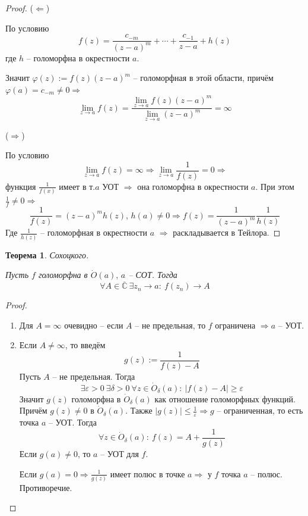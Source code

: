 \documentclass[a4paper,12pt]{article}
\renewcommand{\phi}{\ensuremath{\varphi}}
\renewcommand{\leq}{\ensuremath{\leqslant}}
\renewcommand{\geq}{\ensuremath{\geqslant}}
\theoremstyle{plain}
\newtheorem{theorem}{Теорема}[section]
\theoremstyle{definition}
\theoremstyle{remark}
\begin{document}
\begin{proof}
	($\Leftarrow$)

	По условию
	\[
		f(z) = \frac{c_{-m}}{(z - a)^m} + \cdots + \frac{c_{-1}}{z -a} + h(z)
	\]
	где $h$ -- голоморфна в окрестности $a$.

	Значит $\phi(z) := f(z)(z - a)^m$ -- голоморфная в этой области, причём $\phi(a) = c_{-m} \neq 0 \Rightarrow$
	\[
		\lim_{z \to a}f(z) = \frac{\lim_{z \to a} f(z)(z - a)^m}{\lim_{z \to a} (z - a)^m} = \infty
	\]

	($\Rightarrow$)

	По условию
	\[
		\lim_{z \to a} f(z) = \infty \Rightarrow \lim_{z \to a}\frac{1}{f(z)} = 0 \Rightarrow
	\]
	функция $\frac{1}{f(x)}$ имеет в т.$a$ УОТ $\Rightarrow$ она голоморфна в окрестности $a$. При этом $\frac{1}{f} \neq 0 \Rightarrow$
	\[
		\frac{1}{f(z)} = (z - a)^mh(z),\, h(a) \neq 0 \Rightarrow f(z) = \frac{1}{(z - a)^m}\frac{1}{h(z)}
	\]
	Где $\frac{1}{h(z)}$ -- голоморфная в окрестности $a$ $\Rightarrow$ раскладывается в Тейлора.
\end{proof}

\begin{theorem}
	Сохоцкого.

	Пусть $f$ голоморфна в $\dot{O}(a),\, a$ -- СОТ. Тогда
	\[
		\forall A \in \overline{\mathbb{C}} \: \exists z_n \to a :\: f(z_n) \to A
	\]
\end{theorem}

\begin{proof}
	\begin{enumerate}
		\item Для $A = \infty$ очевидно -- если $A$ -- не предельная, то $f$ ограничена $\Rightarrow a$ -- УОТ.
		\item Если $A \neq \infty$, то введём
		      \[
			      g(z) := \frac{1}{f(z) - A}
		      \]
		      Пусть $A$ -- не предельная. Тогда
		      \[
			      \exists \varepsilon > 0 \: \exists \delta > 0 \: \forall z \in \dot{O}_\delta(a) :\: \vert f(z) - A\vert \geq \varepsilon
		      \]
		      Значит $g(z)$ голоморфна в $\dot{O}_\delta(a)$ как отношение голоморфных функций. Причём $g(z) \neq 0$ в $\dot{O}_\delta(a)$. Также $\vert g(z)\vert \leq \frac{1}{\varepsilon} \Rightarrow g$ -- ограниченная, то есть точка $a$ -- УОТ. Тогда
		      \[
			      \forall z \in \dot{O}_\delta(a) :\: f(z) = A + \frac{1}{g(z)}
		      \]
		      Если $g(a) \neq 0$, то $a$ -- УОТ для $f$.

		      Если $g(a) = 0 \Rightarrow \frac{1}{g(z)}$ имеет полюс в точке $a \Rightarrow$ у $f$ точка $a$ -- полюс. Противоречие.
	\end{enumerate}
\end{proof}
\end{document}
